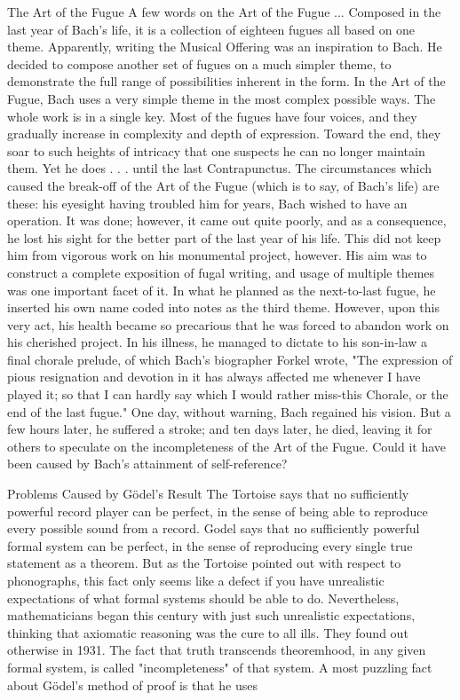                                      The Art of the Fugue
A few words on the Art of the Fugue ... Composed in the last year of Bach's life, it is a
collection of eighteen fugues all based on one theme. Apparently, writing the Musical
Offering was an inspiration to Bach. He decided to compose another set of fugues on a
much simpler theme, to demonstrate the full range of possibilities inherent in the form. In
the Art of the Fugue, Bach uses a very simple theme in the most complex possible ways.
The whole work is in a single key. Most of the fugues have four voices, and they
gradually increase in complexity and depth of expression. Toward the end, they soar to
such heights of intricacy that one suspects he can no longer maintain them. Yet he does . .
. until the last Contrapunctus.
         The circumstances which caused the break-off of the Art of the Fugue (which is to
say, of Bach's life) are these: his eyesight having troubled him for years, Bach wished to
have an operation. It was done; however, it came out quite poorly, and as a consequence,
he lost his sight for the better part of the last year of his life. This did not keep him from
vigorous work on his monumental project, however. His aim was to construct a complete
exposition of fugal writing, and usage of multiple themes was one important facet of it. In
what he planned as the next-to-last fugue, he inserted his own name coded into notes as
the third theme. However, upon this very act, his health became so precarious that he was
forced to abandon work on his cherished project. In his illness, he managed to dictate to
his son-in-law a final chorale prelude, of which Bach's biographer Forkel wrote, "The
expression of pious resignation and devotion in it has always affected me whenever I
have played it; so that I can hardly say which I would rather miss-this Chorale, or the end
of the last fugue."
         One day, without warning, Bach regained his vision. But a few hours later, he
suffered a stroke; and ten days later, he died, leaving it for others to speculate on the
incompleteness of the Art of the Fugue. Could it have been caused by Bach's attainment
of self-reference?

                           Problems Caused by Gödel’s Result
        The Tortoise says that no sufficiently powerful record player can be perfect, in the
sense of being able to reproduce every possible sound from a record. Godel says that no
sufficiently powerful formal system can be perfect, in the sense of reproducing every
single true statement as a theorem. But as the Tortoise pointed out with respect to
phonographs, this fact only seems like a defect if you have unrealistic expectations of
what formal systems should be able to do. Nevertheless, mathematicians began this
century with just such unrealistic expectations, thinking that axiomatic reasoning was the
cure to all ills. They found out otherwise in 1931. The fact that truth transcends
theoremhood, in any given formal system, is called "incompleteness" of that system.
        A most puzzling fact about Gödel’s method of proof is that he uses





